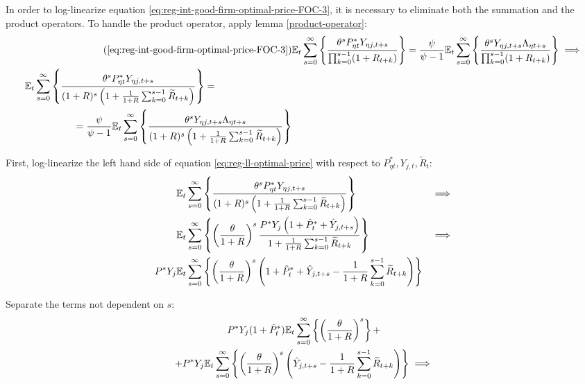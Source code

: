 \documentclass[
	thesis.tex
	]{subfiles}
\begin{document}
In order to log-linearize equation \ref{eq:reg-int-good-firm-optimal-price-FOC-3}, it is necessary to eliminate both the summation and the product operators. To handle the product operator, apply lemma \ref{product-operator}:
\begin{align}
	\tag{\ref{eq:reg-int-good-firm-optimal-price-FOC-3}}
	& \E \sum_{s=0}^{\infty} \left\{ \frac{\theta^s P_{\eta t}^\ast Y_{\eta j,t+s} }{ \prod_{k=0}^{s-1}(1+R_{t+k})} \right\} = \frac{\psi}{\psi-1} \E \sum_{s=0}^{\infty} \left\{ \frac{\theta^s Y_{\eta j,t+s} \Lambda_{\eta t+s}}{\prod_{k=0}^{s-1}(1+R_{t+k})} \right\} \implies
	\\
	\begin{split}
		& \E \sum_{s=0}^{\infty} \left\{ \frac{\theta^s P_{\eta t}^\ast Y_{\eta j,t+s}}{ (1 + R)^s \left( 1 + \frac{1}{1 + R} \sum_{k=0}^{s-1} \widetilde{R}_{t+k} \right) } \right\} = 
		\\ & \quad \quad \quad \quad \quad = \frac{\psi}{\psi-1} \E \sum_{s=0}^{\infty} \left\{ \frac{\theta^s Y_{\eta j,t+s} \Lambda_{\eta t+s}}{ (1 + R)^s \left( 1 + \frac{1}{1 + R} \sum_{k=0}^{s-1} \widetilde{R}_{t+k} \right) } \right\} \label{eq:reg-ll-optimal-price}
	\end{split}
\end{align}

First, log-linearize the left hand side of equation \ref{eq:reg-ll-optimal-price} with respect to \( P_{\eta t}^\ast, Y_{j,t}, \widetilde{R}_t \):
\begin{alignat}{2}
	& {\mathbb{E}_{t}} \sum_{s=0}^{\infty} \left\{ \frac{\theta^s P_{\eta t}^\ast Y_{\eta j,t+s}}{ (1 + R)^s \left( 1 + \frac{1}{1 + R} \sum_{k=0}^{s-1} \widetilde{R}_{t+k} \right) } \right\} &\implies \nonumber \\
	& {\mathbb{E}_{t}} \sum_{s=0}^{\infty} \left\{ \left( \frac{\theta}{1 + R} \right)^s  \frac{ P^\ast Y_{j} \left( 1 + \hat{P}_t^\ast + \hat{Y}_{j,t+s} \right) }{ 1 + \frac{1}{1 + R} \sum_{k=0}^{s-1} \widetilde{R}_{t+k} } \right\} &\implies \nonumber \\
	P^\ast Y_{j} &{\mathbb{E}_{t}} \sum_{s=0}^{\infty} \left\{ \left( \frac{\theta}{1 + R} \right)^s \left( 1 + \hat{P}_t^\ast + \hat{Y}_{j,t+s} - \frac{1}{1 + R} \sum_{k=0}^{s-1} \widetilde{R}_{t+k} \right) \right\} & \nonumber
\end{alignat}

Separate the terms not dependent on $s$:
\begin{multline}
	P^\ast Y_{j} ( 1 + \hat{P}_t^\ast ) {\mathbb{E}_{t}} \sum_{s=0}^{\infty} \left\{ \left( \frac{\theta}{1 + R} \right)^s \right\} + \\
	+ P^\ast Y_{j} {\mathbb{E}_{t}} \sum_{s=0}^{\infty} \left\{ \left( \frac{\theta}{1 + R} \right)^s \left( \hat{Y}_{j,t+s} - \frac{1}{1 + R} \sum_{k=0}^{s-1} \widetilde{R}_{t+k} \right) \right\} \implies \nonumber
\end{multline}
\end{document}
